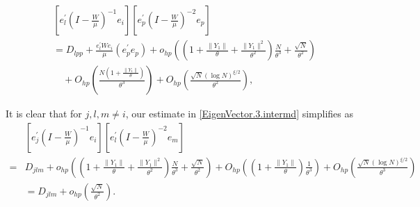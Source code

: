 \documentclass[10pt,a4paper]{amsart}
\begin{document}
\begin{align}
&\left[e_l^\prime\left(I - \frac{W}{\mu}\right)^{-1}e_i\right]\left[e_p^\prime\left(I - \frac{W}{\mu}\right)^{-2}e_p\right] \nonumber\\
&= D_{lpp} + \frac{e_l^\prime W e_i}{\mu}(e_p^\prime e_p)
+ o_{hp}\left(\left(1 + \frac{\|Y_1\|}{\theta} + \frac{\|Y_1\|^2}{\theta^2}\right)\frac{N}{\theta^3} + \frac{\sqrt{N}}{\theta^2}\right) \nonumber\\
&\quad + O_{hp}\left(\frac{N(1+\frac{\|Y_1\|}{\theta})}{\theta^3}\right)
+ O_{hp}\left(\frac{\sqrt{N}(\log N)^{\xi/2}}{\theta^2}\right),\label{EigenVector.3.intermd}
\end{align}

\begin{remark}\label{Remark:djlm}
It is clear that for $j,l,m \ne i$, our estimate in \eqref{EigenVector.3.intermd} simplifies as  
\begin{align}
 & \left[e_j^\prime\left(I - \frac{W}{\mu}\right)^{-1}e_i\right]\left[e_l^\prime\left(I - \frac{W}{\mu}\right)^{-2}e_m\right]\nonumber \\
 = &  D_{jlm} + o_{hp}\left(\left(1 + \frac{\|Y_1\|}{\theta} + \frac{\|Y_1\|^2}{\theta^2}\right)\frac{N}{\theta^3} + \frac{\sqrt{N}}{\theta^2}\right) + O_{hp}\left(\left(1 + \frac{\|Y_1\|}{\theta} \right)\frac{1}{\theta^3}\right) + O_{hp}\left(\frac{\sqrt{N}(\log N)^{\xi/2}}{\theta^3}\right) \nonumber\\
&= D_{jlm} + o_{hp}\left( \frac{\sqrt{N}}{\theta^2}\right).\label{EigenVector.3.exten} 
\end{align}
\end{remark}
\end{document}
